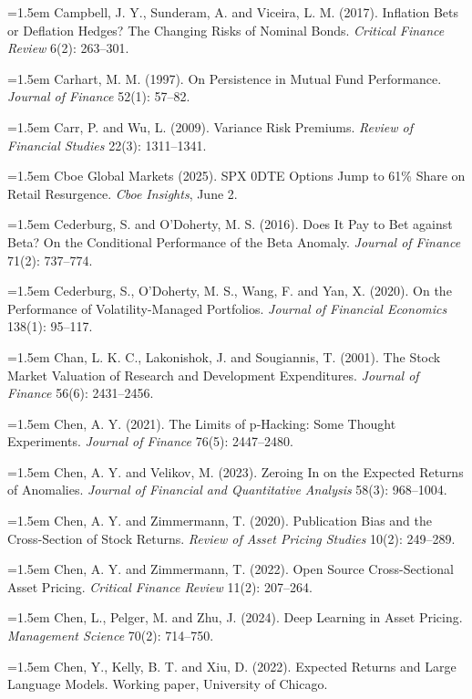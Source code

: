 \hangindent=1.5em Campbell, J. Y., Sunderam, A. and Viceira, L. M. (2017). Inflation Bets or Deflation Hedges? The Changing Risks of Nominal Bonds. \emph{Critical Finance Review} 6(2): 263--301.

\hangindent=1.5em Carhart, M. M. (1997). On Persistence in Mutual Fund Performance. \emph{Journal of Finance} 52(1): 57--82.

\hangindent=1.5em Carr, P. and Wu, L. (2009). Variance Risk Premiums. \emph{Review of Financial Studies} 22(3): 1311--1341.

\hangindent=1.5em Cboe Global Markets (2025). SPX 0DTE Options Jump to 61\% Share on Retail Resurgence. \emph{Cboe Insights}, June 2.

\hangindent=1.5em Cederburg, S. and O'Doherty, M. S. (2016). Does It Pay to Bet against Beta? On the Conditional Performance of the Beta Anomaly. \emph{Journal of Finance} 71(2): 737--774.

\hangindent=1.5em Cederburg, S., O'Doherty, M. S., Wang, F. and Yan, X. (2020). On the Performance of Volatility-Managed Portfolios. \emph{Journal of Financial Economics} 138(1): 95--117.

\hangindent=1.5em Chan, L. K. C., Lakonishok, J. and Sougiannis, T. (2001). The Stock Market Valuation of Research and Development Expenditures. \emph{Journal of Finance} 56(6): 2431--2456.

\hangindent=1.5em Chen, A. Y. (2021). The Limits of p-Hacking: Some Thought Experiments. \emph{Journal of Finance} 76(5): 2447--2480.

\hangindent=1.5em Chen, A. Y. and Velikov, M. (2023). Zeroing In on the Expected Returns of Anomalies. \emph{Journal of Financial and Quantitative Analysis} 58(3): 968--1004.

\hangindent=1.5em Chen, A. Y. and Zimmermann, T. (2020). Publication Bias and the Cross-Section of Stock Returns. \emph{Review of Asset Pricing Studies} 10(2): 249--289.

\hangindent=1.5em Chen, A. Y. and Zimmermann, T. (2022). Open Source Cross-Sectional Asset Pricing. \emph{Critical Finance Review} 11(2): 207--264.

\hangindent=1.5em Chen, L., Pelger, M. and Zhu, J. (2024). Deep Learning in Asset Pricing. \emph{Management Science} 70(2): 714--750.

\hangindent=1.5em Chen, Y., Kelly, B. T. and Xiu, D. (2022). Expected Returns and Large Language Models. Working paper, University of Chicago.

